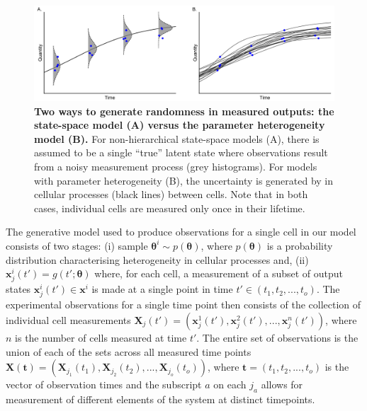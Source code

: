 \documentclass[10pt,letterpaper]{article}
\begin{document}
\begin{figure}[H]
	\centerline{\includegraphics[width=\textwidth]{../figures/data_generation.pdf}}
	\caption{\textbf{Two ways to generate randomness in measured outputs: the state-space model (A) versus the parameter heterogeneity model (B).} For non-hierarchical state-space models (A), there is assumed to be a single ``true'' latent state where observations result from a noisy measurement process (grey histograms). For models with parameter heterogeneity (B), the uncertainty is generated by in cellular processes (black lines) between cells. Note that in both cases, individual cells are measured only once in their lifetime.}
	\label{fig:data_generation}
\end{figure}

The generative model used to produce observations for a single cell in our model consists of two stages: (i) sample $\boldsymbol{\theta}^i\sim p(\boldsymbol{\theta})$, where $p(\boldsymbol{\theta})$ is a probability distribution characterising heterogeneity in cellular processes and, (ii) $\boldsymbol{x}_j^i(t') = g(t'; \boldsymbol{\theta})$ where, for each cell, a measurement of a subset of output states $\boldsymbol{x}_j^i(t')\in\boldsymbol{x}^i$ is made at a single point in time $t'\in (t_1, t_2, ..., t_o)$. The experimental observations for a single time point then consists of the collection of individual cell measurements $\boldsymbol{X}_j(t') = (\boldsymbol{x}_j^1(t'), \boldsymbol{x}_j^2(t'), ..., \boldsymbol{x}_j^n(t'))$, where $n$ is the number of cells measured at time $t'$. The entire set of observations is the union of each of the sets across all measured time points $\boldsymbol{X}(\boldsymbol{t}) = (\boldsymbol{X}_{j_1}(t_1), \boldsymbol{X}_{j_2}(t_2), ..., \boldsymbol{X}_{j_o}(t_o))$, where $\boldsymbol{t}=(t_1, t_2, ..., t_o)$ is the vector of observation times and the subscript $a$ on each $j_a$ allows for measurement of different elements of the system at distinct timepoints.
\end{document}

